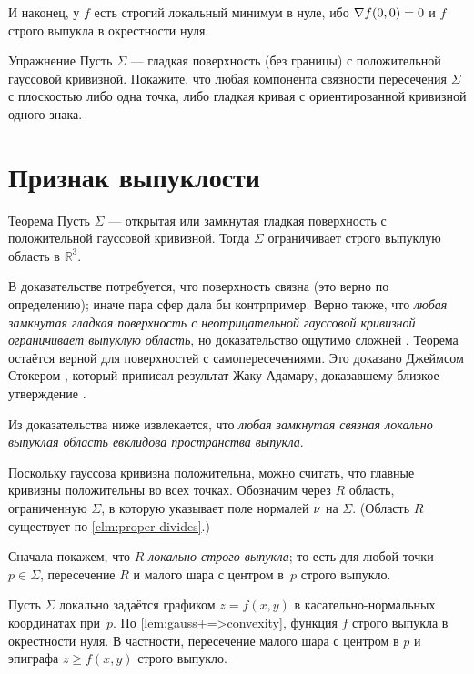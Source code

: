 {\sloppy

И наконец, у $f$ есть строгий локальный минимум в нуле,
ибо $\nabla f(0,0)\z=0$ и $f$ строго выпукла в окрестности нуля.
\qeds

}

\begin{thm}{Упражнение}\label{ex:section-of-convex}
Пусть $\Sigma$ --- гладкая поверхность (без границы) с положительной гауссовой кривизной.
Покажите, что любая компонента связности пересечения $\Sigma$ с плоскостью либо одна точка, либо гладкая кривая с ориентированной кривизной одного знака.
\end{thm}

\section{Признак выпуклости}

\begin{thm}{Теорема}\label{thm:convex-embedded}
Пусть $\Sigma$ --- открытая или замкнутая гладкая поверхность с положительной гауссовой кривизной.
Тогда $\Sigma$ ограничивает строго выпуклую область в $\mathbb{R}^3$.
\end{thm}

В доказательстве потребуется, что поверхность связна (это верно по определению);
иначе пара сфер дала бы контрпример.
Верно также, что \textit{любая замкнутая гладкая поверхность с неотрицательной гауссовой кривизной ограничивает выпуклую область},
но доказательство ощутимо сложней \cite{hadamard,gomes,sacksteder}.
Теорема остаётся верной для поверхностей с самопересечениями. 
Это доказано Джеймсом Стокером \cite{stoker}, который приписал результат Жаку Адамару, доказавшему близкое утверждение \cite[§ 23]{hadamard}.

Из доказательства ниже извлекается, что \textit{любая замкнутая связная локально выпуклая область евклидова пространства выпукла}.


Поскольку гауссова кривизна положительна, можно считать, что главные кривизны положительны во всех точках.
Обозначим через $R$ область, ограниченную $\Sigma$, в которую указывает поле нормалей $\nu$ на $\Sigma$.
(Область $R$ существует по \ref{clm:proper-divides}.)

Сначала покажем, что $R$ {}\emph{локально строго выпукла};
то есть для любой точки $p\in \Sigma$, пересечение $R$ и малого шара с центром в~$p$ строго выпукло.

Пусть $\Sigma$ локально задаётся графиком $z=f(x,y)$ в касательно-нормальных координатах при~$p$.
По \ref{lem:gauss+=>convexity}, функция $f$ строго выпукла в окрестности нуля.
В частности, пересечение малого шара с центром в $p$ и эпиграфа $z\ge f(x,y)$ строго выпукло.

